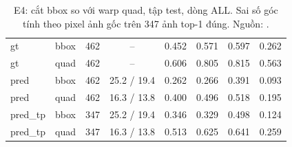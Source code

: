 \begin{table}[htbp]
\centering
\caption[E4: cắt bbox so với warp quad (test, ALL)]{E4: cắt bbox so với warp quad, tập test, dòng ALL. Sai số góc tính theo pixel ảnh gốc trên 347 ảnh top-1 đúng. Nguồn: .}
\label{tab:e4}
\footnotesize
\setlength{\tabcolsep}{3pt}
\begin{tabularx}{\textwidth}{llCCCCCC}
\hline
{}  &  &  &  &  &  &  &  \\
\hline
gt & bbox & 462 & -- & 0.452 & 0.571 & 0.597 & 0.262 \\
gt & quad & 462 & -- & 0.606 & 0.805 & 0.815 & 0.563 \\
\hline
pred & bbox & 462 & 25.2 / 19.4 & 0.262 & 0.266 & 0.391 & 0.093 \\
pred & quad & 462 & 16.3 / 13.8 & 0.400 & 0.496 & 0.518 & 0.195 \\
\hline
pred\_tp & bbox & 347 & 25.2 / 19.4 & 0.346 & 0.329 & 0.498 & 0.124 \\
pred\_tp & quad & 347 & 16.3 / 13.8 & 0.513 & 0.625 & 0.641 & 0.259 \\
\hline
\end{tabularx}
\end{table}
